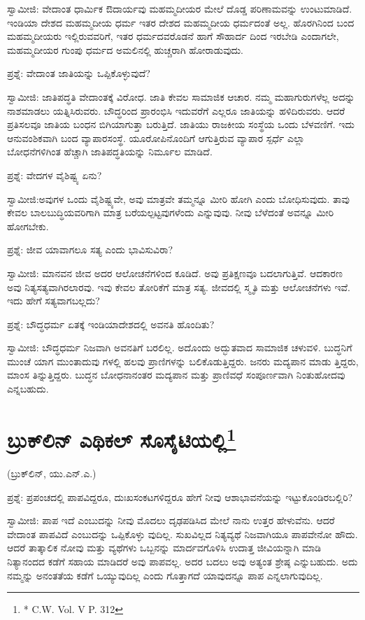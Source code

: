 ಸ್ವಾಮೀಜಿ: ವೇದಾಂತ ಧಾರ್ಮಿಕ ಔದಾರ್ಯವು ಮಹಮ್ಮದೀಯರ ಮೇಲೆ ದೊಡ್ಡ ಪರಿಣಾಮವನ್ನು ಉಂಟುಮಾಡಿದೆ. ಇಂಡಿಯಾ ದೇಶದ ಮಹಮ್ಮದೀಯ ಧರ್ಮ ಇತರ ದೇಶದ ಮಹಮ್ಮದೀಯ ಧರ್ಮದಂತೆ ಅಲ್ಲ. ಹೊರಗಿನಿಂದ ಬಂದ ಮಹಮ್ಮದೀಯರು ಇಲ್ಲಿರುವವರಿಗೆ, ಇತರ ಧರ್ಮದವರೊಡನೆ ಹಾಗೆ ಸೌಹಾರ್ದ ದಿಂದ ಇರಬೇಡಿ ಎಂದಾಗಲೇ, ಮಹಮ್ಮದೀಯರ ಗುಂಪು ಧರ್ಮದ ಅಮಲಿನಲ್ಲಿ ಹುಚ್ಚರಾಗಿ ಹೋರಾಡುವುದು.

ಪ್ರಶ್ನೆ: ವೇದಾಂತ ಜಾತಿಯನ್ನು ಒಪ್ಪಿಕೊಳ್ಳುವುದೆ?

ಸ್ವಾಮೀಜಿ: ಜಾತಿಪದ್ಧತಿ ವೇದಾಂತಕ್ಕೆ ವಿರೋಧ. ಜಾತಿ ಕೇವಲ ಸಾಮಾಜಿಕ ಆಚಾರ. ನಮ್ಮ ಮಹಾಗುರುಗಳೆಲ್ಲ ಅದನ್ನು ನಾಶಮಾಡಲು ಯತ್ನಿಸಿರುವರು. ಬೌದ್ಧರಿಂದ ಪ್ರಾರಂಭಿಸಿ ಇದುವರೆಗೆ ಎಲ್ಲರೂ ಜಾತಿಯನ್ನು ಹಳಿದಿರುವರು. ಆದರೆ ಪ್ರತಿಸಲವೂ ಜಾತಿಯ ಬಂಧನ ಬಿಗಿಯಾಗುತ್ತಾ ಬರುತ್ತಿದೆ. ಜಾತಿಯು ರಾಜಕೀಯ ಸಂಸ್ಥೆಯ ಒಂದು ಬೆಳವಣಿಗೆ. ಇದು ಆನುವಂಶಿಕವಾಗಿ ಬಂದ ವ್ಯಾಪಾರಸಂಸ್ಥೆ. ಯೂರೋಪಿನೊಂದಿಗೆ ಆಗುತ್ತಿರುವ ವ್ಯಾಪಾರ ಸ್ಪರ್ಧೆ ಎಲ್ಲಾ ಬೋಧನೆಗಳಿಗಿಂತ ಹೆಚ್ಚಾಗಿ ಜಾತಿಪದ್ಧತಿಯನ್ನು ನಿರ್ಮೂಲ ಮಾಡಿದೆ.

ಪ್ರಶ್ನೆ: ವೇದಗಳ ವೈಶಿಷ್ಟ್ಯ ಏನು?

ಸ್ವಾಮೀಜಿ:ಅವುಗಳ ಒಂದು ವೈಶಿಷ್ಟ್ಯವೇ, ಅವು ಮಾತ್ರವೇ ತಮ್ಮನ್ನೂ ಮೀರಿ ಹೋಗಿ ಎಂದು ಬೋಧಿಸುವುದು. ತಾವು ಕೇವಲ ಬಾಲಬುದ್ಧಿಯವರಿಗಾಗಿ ಮಾತ್ರ ಬರೆಯಲ್ಪಟ್ಟವುಗಳೆಂದು ಎನ್ನುವುವು. ನೀವು ಬೆಳೆದಂತೆ ಅವನ್ನೂ ಮೀರಿ ಹೋಗಬೇಕು.

ಪ್ರಶ್ನೆ: ಜೀವ ಯಾವಾಗಲೂ ಸತ್ಯ ಎಂದು ಭಾವಿಸುವಿರಾ?

ಸ್ವಾಮೀಜಿ: ಮಾನವನ ಜೀವ ಅದರ ಆಲೋಚನೆಗಳಿಂದ ಕೂಡಿದೆ. ಅವು ಪ್ರತಿಕ್ಷಣವೂ ಬದಲಾಗುತ್ತಿವೆ. ಆದಕಾರಣ ಅವು ನಿತ್ಯಸತ್ಯವಾಗಿರಲಾರವು. ಇವು ಕೇವಲ ತೋರಿಕೆಗೆ ಮಾತ್ರ ಸತ್ಯ. ಜೀವದಲ್ಲಿ ಸ್ಮೃತಿ ಮತ್ತು ಆಲೋಚನೆಗಳು ಇವೆ. ಇದು ಹೇಗೆ ಸತ್ಯವಾಗಬಲ್ಲದು?

ಪ್ರಶ್ನೆ: ಬೌದ್ಧಧರ್ಮ ಏತಕ್ಕೆ ಇಂಡಿಯಾದೇಶದಲ್ಲಿ ಅವನತಿ ಹೊಂದಿತು?

ಸ್ವಾಮೀಜಿ: ಬೌದ್ಧಧರ್ಮ ನಿಜವಾಗಿ ಅವನತಿಗೆ ಬರಲಿಲ್ಲ. ಅದೊಂದು ಅದ್ಭುತವಾದ ಸಾಮಾಜಿಕ ಚಳುವಳಿ. ಬುದ್ಧನಿಗೆ ಮುಂಚೆ ಯಾಗ ಮುಂತಾದುವು ಗಳಲ್ಲಿ ಹಲವು ಪ್ರಾಣಿಗಳನ್ನು ಬಲಿಕೊಡುತ್ತಿದ್ದರು. ಜನರು ಮದ್ಯಪಾನ ಮಾಡು ತ್ತಿದ್ದರು, ಮಾಂಸ ತಿನ್ನುತ್ತಿದ್ದರು. ಬುದ್ಧನ ಬೋಧನಾನಂತರ ಮದ್ಯಪಾನ ಮತ್ತು ಪ್ರಾಣಿವಧೆ ಸಂಪೂರ್ಣವಾಗಿ ನಿಂತುಹೋದವು ಎನ್ನಬಹುದು.


\section[ಬ್ರುಕ್‍ಲಿನ್ ಎಥಿಕಲ್ ಸೊಸೈಟಿಯಲ್ಲಿ]{ಬ್ರುಕ್‍ಲಿನ್ ಎಥಿಕಲ್ ಸೊಸೈಟಿಯಲ್ಲಿ\protect\footnote{* C.W. Vol. V P. 312}}

\begin{center}
(ಬ್ರುಕ್​ಲಿನ್​, ಯು.ಎನ್​.ಎ.)
\end{center}

ಪ್ರಶ್ನೆ: ಪ್ರಪಂಚದಲ್ಲಿ ಪಾಪವಿದ್ದರೂ, ದುಃಖಸಂಕಟಗಳಿದ್ದರೂ ಹೇಗೆ ನೀವು ಆಶಾಭಾವನೆಯನ್ನು ಇಟ್ಟುಕೊಂಡಿರಬಲ್ಲಿರಿ?

ಸ್ವಾಮೀಜಿ: ಪಾಪ ಇದೆ ಎಂಬುದನ್ನು ನೀವು ಮೊದಲು ದೃಢಪಡಿಸಿದ ಮೇಲೆ ನಾನು ಉತ್ತರ ಹೇಳುವೆನು. ಆದರೆ ವೇದಾಂತ ಪಾಪವಿದೆ ಎಂಬುದನ್ನು ಒಪ್ಪಿಕೊಳ್ಳು ವುದಿಲ್ಲ. ಸುಖವಿಲ್ಲದ ನಿತ್ಯವ್ಯಥೆ ನಿಜವಾಗಿಯೂ ಪಾಪವೇನೋ ಹೌದು. ಆದರೆ ತಾತ್ಕಾಲಿಕ ನೋವು ಮತ್ತು ವ್ಯಥೆಗಳು ಒಬ್ಬನನ್ನು ಮಾರ್ದವಗೊಳಿಸಿ ಉದಾತ್ತ ಜೀವಿಯನ್ನಾಗಿ ಮಾಡಿ ನಿತ್ಯಾನಂದದ ಕಡೆಗೆ ಸಹಾಯ ಮಾಡಿದರೆ ಅವು ಪಾಪವಲ್ಲ. ಅದರ ಬದಲು ಅವು ಅತ್ಯಂತ ಶ್ರೇಷ್ಠ ಎನ್ನುಬಹುದು. ಅದು ನಮ್ಮನ್ನು ಅನಂತತೆಯ ಕಡೆಗೆ ಒಯ್ಯುವುದಿಲ್ಲ ಎಂದು ಗೊತ್ತಾಗದೆ ಯಾವುದನ್ನೂ ಪಾಪ ಎನ್ನಲಾಗುವುದಿಲ್ಲ.

